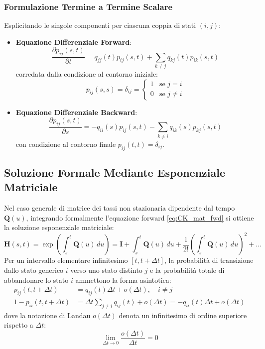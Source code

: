 \documentclass[11pt, a4paper]{article}
\begin{document}
\subsubsection{Formulazione Termine a Termine Scalare}
Esplicitando le singole componenti per ciascuna coppia di stati $(i, j)$:
\begin{itemize}[leftmargin=*]
    \item \textbf{Equazione Differenziale Forward}:
    \begin{equation}
        \boxed{\frac{\partial p_{ij}(s, t)}{\partial t} = q_{jj}(t) p_{ij}(s, t) + \sum_{k \neq j} q_{kj}(t) p_{ik}(s, t)}
    \end{equation}
    corredata dalla condizione al contorno iniziale:
    \[
        p_{ij}(s, s) = \delta_{ij} = \begin{cases} 1 & \text{se } j = i \\ 0 & \text{se } j \neq i \end{cases}
    \]
    \item \textbf{Equazione Differenziale Backward}:
    \begin{equation}
        \boxed{\frac{\partial p_{ij}(s, t)}{\partial s} = -q_{ii}(s) p_{ij}(s, t) - \sum_{k \neq i} q_{ik}(s) p_{kj}(s, t)}
    \end{equation}
    con condizione al contorno finale $p_{ij}(t, t) = \delta_{ij}$.
\end{itemize}

\subsection{Soluzione Formale Mediante Esponenziale Matriciale}

Nel caso generale di matrice dei tassi non stazionaria dipendente dal tempo $\bm{Q}(u)$, integrando formalmente l'equazione forward \eqref{eq:CK_mat_fwd} si ottiene la soluzione esponenziale matriciale:
\[
    \boxed{\bm{H}(s, t) = \exp\left( \int_s^t \bm{Q}(u)\,du \right) = \bm{I} + \int_s^t \bm{Q}(u)\,du + \frac{1}{2!} \left(\int_s^t \bm{Q}(u)\,du\right)^2 + \dots}
\]
Per un intervallo elementare infinitesimo $[t, t + \Delta t]$, la probabilità di transizione dallo stato generico $i$ verso uno stato distinto $j$ e la probabilità totale di abbandonare lo stato $i$ ammettono la forma asintotica:
\begin{align*}
    p_{ij}(t, t + \Delta t) &= q_{ij}(t)\Delta t + o(\Delta t), \quad i \neq j \\
    1 - p_{ii}(t, t + \Delta t) &= \Delta t \sum_{j \neq i} q_{ij}(t) + o(\Delta t) = -q_{ii}(t) \Delta t + o(\Delta t)
\end{align*}
dove la notazione di Landau $o(\Delta t)$ denota un infinitesimo di ordine superiore rispetto a $\Delta t$:
\[
    \lim_{\Delta t \to 0} \frac{o(\Delta t)}{\Delta t} = 0
\]
\end{document}
